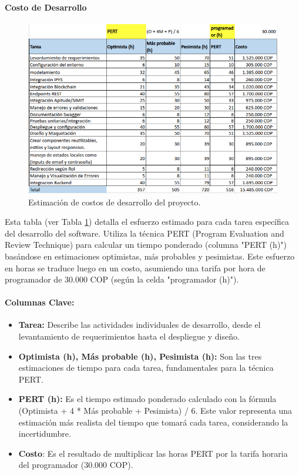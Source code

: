 \documentclass[
    letterpaper, 
    man,   
    spanish,
    12pt,
    donotrepeattitle,
    floatsintext,
    hidelinks %
]{apa7}
\begin{document}
\paragraph{Costo de Desarrollo }
\begin{figure}[htbp]
    \centering
    \includegraphics[width=\textwidth]{Images/costos3.png}
    \caption{Estimación de costos de desarrollo del proyecto.}
    \label{fig:costos3}
\end{figure}

Esta tabla (ver Tabla \ref{fig:costos3}) detalla el esfuerzo estimado para cada tarea específica del desarrollo del software. Utiliza la técnica PERT (Program Evaluation and Review Technique) para calcular un tiempo ponderado (columna "PERT (h)") basándose en estimaciones optimistas, más probables y pesimistas. Este esfuerzo en horas se traduce luego en un costo, asumiendo una tarifa por hora de programador de 30.000 COP (según la celda "programador (h)"). 
\paragraph{Columnas Clave: }
\begin{itemize}
\item \textbf{Tarea:} Describe las actividades individuales de desarrollo, desde el levantamiento de requerimientos hasta el despliegue y diseño. 

\item \textbf{Optimista (h), Más probable (h), Pesimista (h):} Son las tres estimaciones de tiempo para cada tarea, fundamentales para la técnica PERT. 

\item \textbf{PERT (h): }Es el tiempo estimado ponderado calculado con la fórmula (Optimista + 4 * Más probable + Pesimista) / 6. Este valor representa una estimación más realista del tiempo que tomará cada tarea, considerando la incertidumbre. 

\item \textbf{Costo}: Es el resultado de multiplicar las horas PERT por la tarifa horaria del programador (30.000 COP). 
\end{itemize}
 
\end{document}
